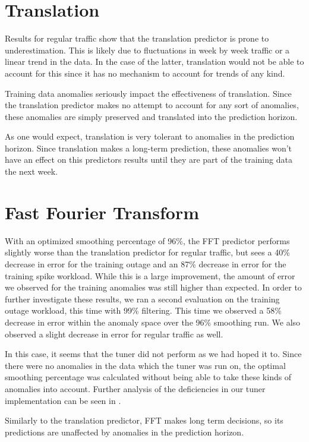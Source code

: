 \section{Translation}
Results for regular traffic show that the translation predictor is prone to underestimation. This is likely due to fluctuations in week by week traffic or a linear trend in the data. In the case of the latter, translation would not be able to account for this since it has no mechanism to account for trends of any kind.

Training data anomalies seriously impact the effectiveness of translation. Since the translation predictor makes no attempt to account for any sort of anomalies, these anomalies are simply preserved and translated into the prediction horizon.

As one would expect, translation is very tolerant to anomalies in the prediction horizon. Since translation makes a long-term prediction, these anomalies won't have an effect on this predictors results until they are part of the training data the next week.



\section{Fast Fourier Transform}
With an optimized smoothing percentage of 96\%, the FFT predictor performs slightly worse than the translation predictor for regular traffic, but sees a 40\% decrease in error for the training outage and an 87\% decrease in error for the training spike workload. While this is a large improvement, the amount of error we observed for the training anomalies was still higher than expected. In order to further investigate these results, we ran a second evaluation on the training outage workload, this time with 99\% filtering. This time we observed a 58\% decrease in error within the anomaly space over the 96\% smoothing run. We also observed a slight decrease in error for regular traffic as well.

In this case, it seems that the tuner did not perform as we had hoped it to. Since there were no anomalies in the data which the \textsf{tuner} was run on, the optimal smoothing percentage was calculated without being able to take these kinds of anomalies into account. Further analysis of the deficiencies in our \textsf{tuner} implementation can be seen in .

Similarly to the translation predictor, FFT makes long term decisions, so its predictions are unaffected by anomalies in the prediction horizon.

